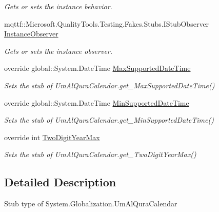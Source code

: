 \begin{DoxyCompactItemize}
\begin{DoxyCompactList}\small\item\em Gets or sets the instance behavior.\end{DoxyCompactList}\item 
mqttf\-::\-Microsoft.\-Quality\-Tools.\-Testing.\-Fakes.\-Stubs.\-I\-Stub\-Observer \hyperlink{class_system_1_1_globalization_1_1_fakes_1_1_stub_um_al_qura_calendar_aaeac9bee4b8be7bb39605f6272c69c87}{Instance\-Observer}
\begin{DoxyCompactList}\small\item\em Gets or sets the instance observer.\end{DoxyCompactList}\item 
override global\-::\-System.\-Date\-Time \hyperlink{class_system_1_1_globalization_1_1_fakes_1_1_stub_um_al_qura_calendar_a76f2ec3c0a011fef9a8ac3a62b618fdb}{Max\-Supported\-Date\-Time}
\begin{DoxyCompactList}\small\item\em Sets the stub of Um\-Al\-Qura\-Calendar.\-get\-\_\-\-Max\-Supported\-Date\-Time()\end{DoxyCompactList}\item 
override global\-::\-System.\-Date\-Time \hyperlink{class_system_1_1_globalization_1_1_fakes_1_1_stub_um_al_qura_calendar_a20bfcffcfc19677868febe1686300041}{Min\-Supported\-Date\-Time}
\begin{DoxyCompactList}\small\item\em Sets the stub of Um\-Al\-Qura\-Calendar.\-get\-\_\-\-Min\-Supported\-Date\-Time()\end{DoxyCompactList}\item 
override int \hyperlink{class_system_1_1_globalization_1_1_fakes_1_1_stub_um_al_qura_calendar_a23dc9beb4cac8171f2ba886fdebaa9b6}{Two\-Digit\-Year\-Max}
\begin{DoxyCompactList}\small\item\em Sets the stub of Um\-Al\-Qura\-Calendar.\-get\-\_\-\-Two\-Digit\-Year\-Max()\end{DoxyCompactList}\end{DoxyCompactItemize}


\subsection{Detailed Description}
Stub type of System.\-Globalization.\-Um\-Al\-Qura\-Calendar



